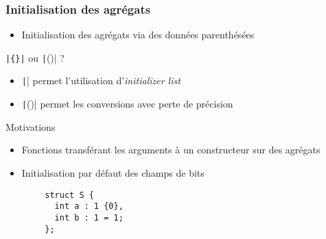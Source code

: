 \documentclass[C++.tex]{subfiles}
\begin{document}
\begin{frame}[fragile]
	\frametitle{Initialisation des agrégats}
	\begin{itemize}
		\item Initialisation des agrégats via des données parenthésées
	\end{itemize}

	\begin{block}{\texttt{|\{\}|} ou \texttt|()| ?}
		\begin{itemize}
			\item \texttt|{}| permet l'utilisation d'\textit{initializer list}
			\item \texttt|()| permet les conversions avec perte de précision
		\end{itemize}
	\end{block}

	\begin{block}{Motivations}
		\begin{itemize}
			\item Fonctions transférant les arguments à un constructeur sur des agrégats
		\end{itemize}
	\end{block}


	\begin{itemize}
		\item Initialisation par défaut des champs de bits
	\end{itemize}

	\begin{verbatim}
		struct S {
		  int a : 1 {0},
		  int b : 1 = 1;
		};
	\end{verbatim}


\end{frame}
\end{document}
